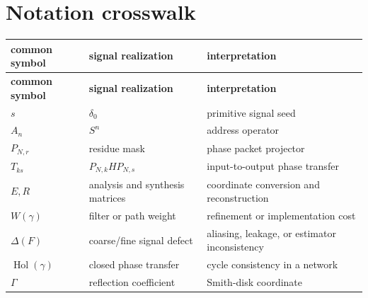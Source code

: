 \documentclass[11pt]{article}
\theoremstyle{definition}
\theoremstyle{remark}
\newcommand{\Gam}{\Gamma}
\begin{document}
\section{Notation crosswalk}

\begin{longtable}{L{0.20\textwidth}L{0.33\textwidth}L{0.37\textwidth}}
\toprule
\textbf{common symbol}&\textbf{signal realization}&\textbf{interpretation}\\
\midrule
\endfirsthead
\toprule
\textbf{common symbol}&\textbf{signal realization}&\textbf{interpretation}\\
\midrule
\endhead
$s$&$\delta_0$&primitive signal seed\\
$A_n$&$S^n$&address operator\\
$P_{N,r}$&residue mask&phase packet projector\\
$T_{ks}$&$P_{N,k}HP_{N,s}$&input-to-output phase transfer\\
$E,R$&analysis and synthesis matrices&coordinate conversion and reconstruction\\
$W(\gamma)$&filter or path weight&refinement or implementation cost\\
$\Delta(F)$&coarse/fine signal defect&aliasing, leakage, or estimator inconsistency\\
$\operatorname{Hol}(\gamma)$&closed phase transfer&cycle consistency in a network\\
$\Gam$&reflection coefficient&Smith-disk coordinate\\
\bottomrule
\end{longtable}
\end{document}
